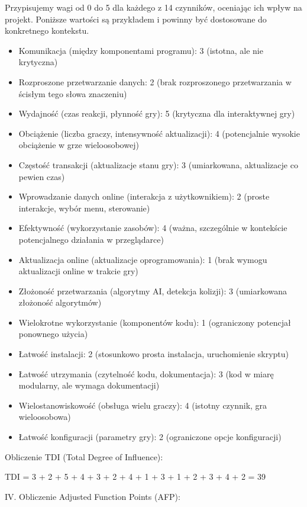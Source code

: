 \documentclass[12pt,a4paper]{article}
\begin{document}
Przypisujemy wagi od 0 do 5 dla każdego z 14 czynników, oceniając ich wpływ na projekt. Poniższe wartości są przykładem i powinny być dostosowane do konkretnego kontekstu.
\begin{itemize}
    \item Komunikacja (między komponentami programu): 3 (istotna, ale nie krytyczna)
    \item Rozproszone przetwarzanie danych: 2 (brak rozproszonego przetwarzania w ścisłym tego słowa znaczeniu)
    \item Wydajność (czas reakcji, płynność gry): 5 (krytyczna dla interaktywnej gry)
    \item Obciążenie (liczba graczy, intensywność aktualizacji): 4 (potencjalnie wysokie obciążenie w grze wieloosobowej)
    \item Częstość transakcji (aktualizacje stanu gry): 3 (umiarkowana, aktualizacje co pewien czas)
    \item Wprowadzanie danych online (interakcja z użytkownikiem): 2 (proste interakcje, wybór menu, sterowanie)
    \item Efektywność (wykorzystanie zasobów): 4 (ważna, szczególnie w kontekście potencjalnego działania w przeglądarce)
    \item Aktualizacja online (aktualizacje oprogramowania): 1 (brak wymogu aktualizacji online w trakcie gry)
    \item Złożoność przetwarzania (algorytmy AI, detekcja kolizji): 3 (umiarkowana złożoność algorytmów)
    \item Wielokrotne wykorzystanie (komponentów kodu): 1 (ograniczony potencjał ponownego użycia)
    \item Łatwość instalacji: 2 (stosunkowo prosta instalacja, uruchomienie skryptu)
    \item Łatwość utrzymania (czytelność kodu, dokumentacja): 3 (kod w miarę modularny, ale wymaga dokumentacji)
    \item Wielostanowiskowość (obsługa wielu graczy): 4 (istotny czynnik, gra wieloosobowa)
    \item Łatwość konfiguracji (parametry gry): 2 (ograniczone opcje konfiguracji)
\end{itemize} 



Obliczenie TDI (Total Degree of Influence):

TDI = 3 + 2 + 5 + 4 + 3 + 2 + 4 + 1 + 3 + 1 + 2 + 3 + 4 + 2 = 39

IV. Obliczenie Adjusted Function Points (AFP):
\end{document}
